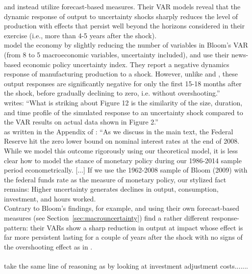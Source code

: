 \documentclass[a4paper,11pt,listof=nochaptergap,oneside,pointednumbers,bibtotoc,bigheadings,liststotoc]{scrbook}
\theoremstyle{mysatz}
\theoremstyle{mydefinition}
\theoremstyle{mytheorem}
\theoremstyle{mybemerkung}
\begin{document}
	\citet{juradoetal:15} and \citet{bachmannetal:13} instead utilize forecast-based measures. Their VAR models reveal that the dynamic response of output to uncertainty shocks sharply reduces the level of production with effects that persist well beyond the horizons considered in their exercise (i.e., more than 4-5 years after the shock).\\
	\citet{bakeretal:15} model the economy by slightly reducing the number of variables in Bloom's VAR (from 8 to 5 macroeconomic variables, uncertainty included), and use their news-based economic policy uncertainty index. They report a negative dynamics response of manufacturing production to a shock. However, unlike \citet{juradoetal:15} and \citet{bachmannetal:13}, these output responses are significantly negative for only the first 15-18 months after the shock, before gradually declining to zero, i.e. without overshooting.''
\\
\citet[p. 651]{bloom:09} writes: ``What is striking about Figure 12 is the similarity of the size, duration, and time profile of the simulated response to an uncertainty shock compared to the VAR results on actual data shown in Figure 2.''
\\
as written in the Appendix of \citet[p. 5]{basuandbundick:17}: ``As we discuss in the main text, the Federal Reserve hit the zero lower bound on nominal interest rates at the end of 2008. While we model this outcome rigorously using our theoretical model, it is less clear how to model the stance of monetary policy during our 1986-2014 sample period econometrically. [...] If we use the 1962-2008 sample of Bloom (2009) with the federal funds rate as the measure of monetary policy, our stylized fact remains: Higher uncertainty generates declines in output, consumption, investment, and hours worked.
\\

Contrary to Bloom's findings, for example, \citet{juradoetal:15} and \citet{bachmannetal:13} using their own forecast-based measures (see Section~\ref{sec:macrouncertainty}) find a rather different response-pattern: their VARs show a sharp reduction in output at impact whose effect is far more persistent lasting for a couple of years after the shock with no signs of the overshooting effect as in \citet{bloom:09}.\\
\\
\citet{bachmannetal:13} take the same line of reasoning as \citet{bloom:09} by looking at investment adjustment costs.......
\\
\\
\end{document}
